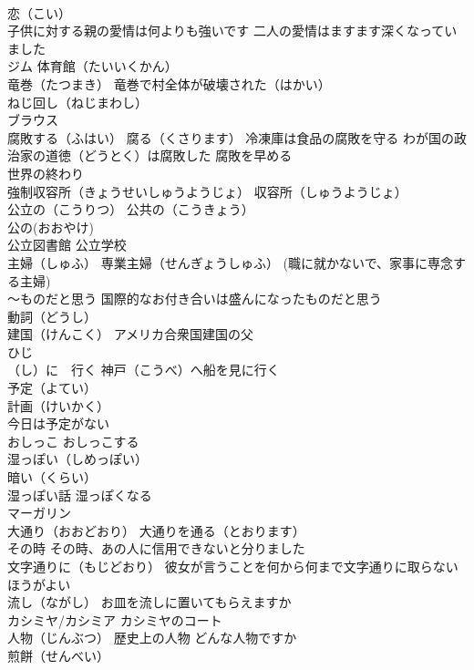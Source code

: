 \documentclass[8pt]{extreport}
\begin{document}
\begin{CJK}{UTF8}{min}
\\	恋（こい） 
\\	子供に対する親の愛情は何よりも強いです 二人の愛情はますます深くなっていました
\\	ジム 体育館（たいいくかん）
\\	竜巻（たつまき） 竜巻で村全体が破壊された（はかい）
\\	ねじ回し（ねじまわし）
\\	ブラウス
\\	腐敗する（ふはい） 腐る（くさります） 冷凍庫は食品の腐敗を守る わが国の政治家の道徳（どうとく）は腐敗した 腐敗を早める
\\	世界の終わり
\\	強制収容所（きょうせいしゅうようじょ） 収容所（しゅうようじょ）
\\	公立の（こうりつ） 公共の（こうきょう）
\\	公の(おおやけ)　
\\	公立図書館 公立学校
\\	主婦（しゅふ） 専業主婦（せんぎょうしゅふ） (職に就かないで、家事に専念する主婦)
\\	～ものだと思う 国際的なお付き合いは盛んになったものだと思う
\\	動詞（どうし）
\\	建国（けんこく） アメリカ合衆国建国の父
\\	ひじ
\\	（し）に　行く 神戸（こうべ）へ船を見に行く
\\	予定（よてい） 
\\	計画（けいかく） 
\\	今日は予定がない
\\	おしっこ おしっこする
\\	湿っぽい（しめっぽい）
\\	暗い（くらい）
\\	湿っぽい話 湿っぽくなる
\\	マーガリン
\\	大通り（おおどおり） 大通りを通る（とおります）
\\	その時 その時、あの人に信用できないと分りました
\\	文字通りに（もじどおり） 彼女が言うことを何から何まで文字通りに取らないほうがよい
\\	流し（ながし） お皿を流しに置いてもらえますか
\\	カシミヤ/カシミア カシミヤのコート
\\	人物（じんぶつ） 歴史上の人物 どんな人物ですか
\\	煎餅（せんべい）

\end{CJK}
\end{document}
